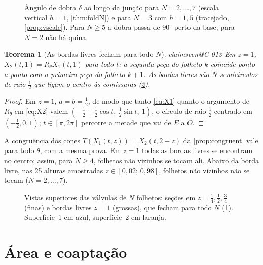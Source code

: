 \documentclass[11pt,a4paper]{article}
\makeatletter
\theoremstyle{plain}
\newtheorem{theorem}{Teorema}[section]
\theoremstyle{remark}
\newcommand{\claim}[1]{\ifcsname claimseen@#1\endcsname\else\expandafter\gdef\csname claimseen@#1\endcsname{}\label{claim:#1}\fi}
\makeatother
\begin{document}
\begin{figure}[t]\centering

\caption{Ângulo de dobra $\delta$ ao longo da junção para $N=2,\dots,7$ (escala vertical $h=1$, \cref{thm:foldN}) e para
$N=3$ com $h=1{,}5$ (tracejado, \cref{prop:vscale}). Para $N\ge5$ a dobra passa de $90^\circ$ perto da base; para $N=2$ não há
quina.}
\label{fig:fold}
\end{figure}

\begin{theorem}[As bordas livres fecham para todo $N$]\label{thm:freeedge}\claim{C-013}
Em $z=1$, $X_2(t,1)=R_\theta X_1(t,1)$ para todo $t$: a segunda peça do folheto $k$ coincide ponto a ponto com a primeira peça
do folheto $k+1$. As bordas livres são $N$ semicírculos de raio $\frac12$ que ligam o centro às comissuras (\cref{fig:top}).
\end{theorem}
\begin{proof}
Em $z=1$, $a=b=\frac12$, de modo que tanto \eqref{eq:X1} quanto o argumento de $R_\theta$ em \eqref{eq:X2} valem
$(-\frac12+\frac12\cos t,\ \frac12\sin t,\ 1)$, o círculo de raio $\frac12$ centrado em $(-\frac12,0,1)$; $t\in[\pi,2\pi]$
percorre a metade que vai de $E$ a $O$.
\end{proof}

A congruência dos cones $T(X_1(t,z))=X_2(t,2-z)$ da \cref{prop:congruent} vale para todo $\theta$, com a mesma prova. Em $z=1$
todas as bordas livres se encontram no centro; assim, para $N\ge4$, folhetos não vizinhos se tocam ali. Abaixo da borda
livre, nas 25 alturas amostradas $z\in[0{,}02;\,0{,}98]$, folhetos não vizinhos não se tocam ($N=2,\dots,7$).

\begin{figure}[t]\centering

\caption{Vistas superiores das válvulas de $N$ folhetos: seções em $z=\frac14,\frac12,\frac34$ (finas) e bordas livres $z=1$
(grossas), que fecham para todo $N$ (\cref{thm:freeedge}). Superfície~1 em azul, superfície~2 em laranja.}
\label{fig:top}
\end{figure}

\section{Área e coaptação}\label{sec:area}
\end{document}
